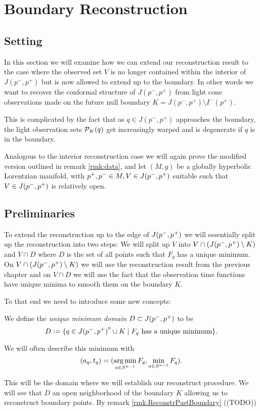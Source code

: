 \chapter{Boundary Reconstruction}

\section{Setting}

In this section we will examine how we can extend our reconstruction result to the case where the observed set $V$ is no longer contained within the interior of $J(p^-,p^+)$ but is now allowed to extend up to the boundary. In other words we want to recover the conformal structure of $J(p^-,p^+)$ from light cone observations made on the future null boundary $K = J(p^-,p^+) \setminus I^-(p^+)$.

This is complicated by the fact that as $q\in J(p^-,p^+)$ approaches the boundary, the light observation sets ${\mathcal{P}}_K(q)$ get increasingly warped and is degenerate if $q$ is in the boundary. 

Analogous to the interior reconstruction case we will again prove the modified version outlined in remark \ref{rmk:data}, and let $(M,g)$ be a globally hyperbolic Lorentzian manifold, with $p^+,p^-\in M,V\in J(p^-,p^+)$ suitable such that $V\in J(p^-,p^+)$ is relatively open.

\section{Preliminaries}
To extend the reconstruction up to the edge of $J(p^-,p^+)$ we will essentially split up the reconstruction into two steps: We will split up $V$ into $V\cap (J(p^-,p^+) \setminus K)$ and $V\cap D$ where $D$ is the set of all points such that $F_q$ has a unique minimum. On $V\cap (J(p^-,p^+) \setminus K)$ we will use the reconstruction result from the previous chapter and on $V\cap D$ we will use the fact that the observation time functions have unique minima to smooth them on the boundary $K$.

To that end we need to introduce some new concepts:
\begin{definition}\label{def:uniquemindomain}
    We define the \emph{unique minimum domain} $D\subset J(p^-,p^+)$ to be 
    \begin{equation}
        D:=\{q\in {\kern0ptJ(p^-,p^+)}^{\mathrm{o}} \cup K \mid F_q\text{ has a unique minimum}\}.
    \end{equation}

    We will often describe this minimum with 
    \[
        (a_q,t_q)=(\operatorname*{arg\,min}_{a\in {S^{n-1}}} F_q, \min_{a\in {S^{n-1}}} F_q).
    \]
\end{definition}
This will be the domain where we will establish our reconstruct procedure. We will see that $D$ an open neighborhood of the boundary $K$ allowing us to reconstruct boundary points. By remark \ref{rmk:ReconstrPastBoundary} ((TODO))

